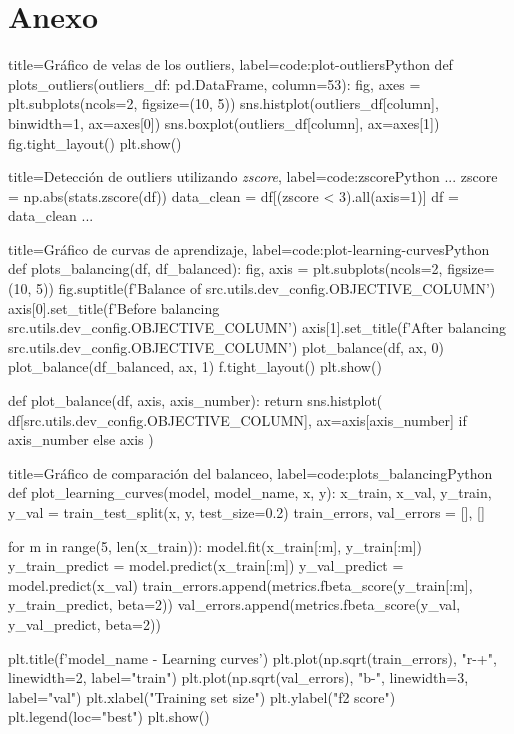 \section{Anexo}\label{sec:anex}

\begin{code}[numbers=left]{title=Gráfico de velas de los outliers, label=code:plot-outliers}{Python}
def plots_outliers(outliers_df: pd.DataFrame, column=53):
    fig, axes = plt.subplots(ncols=2, figsize=(10, 5))
    sns.histplot(outliers_df[column], binwidth=1, ax=axes[0])
    sns.boxplot(outliers_df[column], ax=axes[1])
    fig.tight_layout()
    plt.show()
\end{code}

\begin{code}[numbers=left]{title=Detección de outliers utilizando \textit{zscore}, label=code:zscore}{Python}
...
    zscore = np.abs(stats.zscore(df))
    data_clean = df[(zscore < 3).all(axis=1)]
    df = data_clean
...
\end{code}

\begin{code}[numbers=left]{title=Gráfico de curvas de aprendizaje, label=code:plot-learning-curves}{Python}
def plots_balancing(df, df_balanced):
    fig, axis = plt.subplots(ncols=2, figsize=(10, 5))
    fig.suptitle(f'Balance of {src.utils.dev_config.OBJECTIVE_COLUMN}')
    axis[0].set_title(f'Before balancing {src.utils.dev_config.OBJECTIVE_COLUMN}')
    axis[1].set_title(f'After balancing {src.utils.dev_config.OBJECTIVE_COLUMN}')
    plot_balance(df, ax, 0)
    plot_balance(df_balanced, ax, 1)
    f.tight_layout()
    plt.show()


def plot_balance(df, axis, axis_number):
    return sns.histplot(
        df[src.utils.dev_config.OBJECTIVE_COLUMN], 
        ax=axis[axis_number] if axis_number else axis
        )
\end{code}

\begin{code}[numbers=left]{title=Gráfico de comparación del balanceo, label=code:plots_balancing}{Python}
def plot_learning_curves(model, model_name, x, y):
    x_train, x_val, y_train, y_val = train_test_split(x, y, test_size=0.2)
    train_errors, val_errors = [], []
    
    for m in range(5, len(x_train)):
        model.fit(x_train[:m], y_train[:m])
        y_train_predict = model.predict(x_train[:m])
        y_val_predict = model.predict(x_val)
        train_errors.append(metrics.fbeta_score(y_train[:m], y_train_predict, beta=2))
        val_errors.append(metrics.fbeta_score(y_val, y_val_predict, beta=2))
        
    plt.title(f'{model_name} - Learning curves')
    plt.plot(np.sqrt(train_errors), "r-+", linewidth=2, label="train")
    plt.plot(np.sqrt(val_errors), "b-", linewidth=3, label="val")
    plt.xlabel("Training set size")
    plt.ylabel("f2 score")
    plt.legend(loc="best")
    plt.show()
\end{code}

